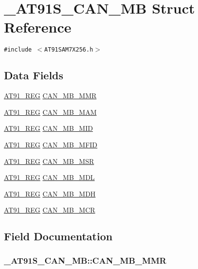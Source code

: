 \hypertarget{struct__AT91S__CAN__MB}{
\section{\_\-AT91S\_\-CAN\_\-MB Struct Reference}
\label{struct__AT91S__CAN__MB}
}
{\tt \#include $<$AT91SAM7X256.h$>$}

\subsection*{Data Fields}
\begin{CompactItemize}
\item 
\hyperlink{AT91SAM7X256_8h_712ad5a1ac1bd02f3e95a7526c283ce1}{AT91\_\-REG} \hyperlink{struct__AT91S__CAN__MB_54268787d609f70861f4311b63836033}{CAN\_\-MB\_\-MMR}
\item 
\hyperlink{AT91SAM7X256_8h_712ad5a1ac1bd02f3e95a7526c283ce1}{AT91\_\-REG} \hyperlink{struct__AT91S__CAN__MB_88174644fd6cf4e176034b1fe7d8d16c}{CAN\_\-MB\_\-MAM}
\item 
\hyperlink{AT91SAM7X256_8h_712ad5a1ac1bd02f3e95a7526c283ce1}{AT91\_\-REG} \hyperlink{struct__AT91S__CAN__MB_21efa474a69196f0df94ff6714e9feb3}{CAN\_\-MB\_\-MID}
\item 
\hyperlink{AT91SAM7X256_8h_712ad5a1ac1bd02f3e95a7526c283ce1}{AT91\_\-REG} \hyperlink{struct__AT91S__CAN__MB_2634668d962e7669f44f042e420ff4d7}{CAN\_\-MB\_\-MFID}
\item 
\hyperlink{AT91SAM7X256_8h_712ad5a1ac1bd02f3e95a7526c283ce1}{AT91\_\-REG} \hyperlink{struct__AT91S__CAN__MB_c0b6e12f73a44773934bb212117ca2b7}{CAN\_\-MB\_\-MSR}
\item 
\hyperlink{AT91SAM7X256_8h_712ad5a1ac1bd02f3e95a7526c283ce1}{AT91\_\-REG} \hyperlink{struct__AT91S__CAN__MB_bfd3dd6c614553af6371be7018ebb091}{CAN\_\-MB\_\-MDL}
\item 
\hyperlink{AT91SAM7X256_8h_712ad5a1ac1bd02f3e95a7526c283ce1}{AT91\_\-REG} \hyperlink{struct__AT91S__CAN__MB_7d39aa4dea8601f47177334d7083332e}{CAN\_\-MB\_\-MDH}
\item 
\hyperlink{AT91SAM7X256_8h_712ad5a1ac1bd02f3e95a7526c283ce1}{AT91\_\-REG} \hyperlink{struct__AT91S__CAN__MB_f51897a132563a5f01cbeef42467bab2}{CAN\_\-MB\_\-MCR}
\end{CompactItemize}


\subsection{Field Documentation}
\hypertarget{struct__AT91S__CAN__MB_54268787d609f70861f4311b63836033}{
\subsubsection{ {\bf \_\-AT91S\_\-CAN\_\-MB::CAN\_\-MB\_\-MMR}}}
\label{struct__AT91S__CAN__MB_54268787d609f70861f4311b63836033}




